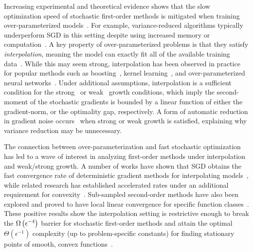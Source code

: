 Increasing experimental and theoretical evidence shows that the slow optimization speed of stochastic first-order methods is mitigated when training over-parameterized models~\citep{ma2018power, arora2018overparameterization, zhou2019analysis}.
For example, variance-reduced algorithms typically underperform \ac{SGD} in this setting despite using increased memory or computation~\citep{defazio2019effectiveness, ma2018power}. 
A key property of over-parameterized problems is that they satisfy \emph{interpolation}, meaning the model can exactly fit all of the available training data~\citep{belkin2019datainterp}.
While this may seem strong, interpolation has been observed in practice for popular methods such as boosting~\citep{schapire1997boosting}, kernel learning~\citep{belkin2019datainterp}, and over-parameterized neural networks~\citep{belkin2019reconciling, zhang2013gradient}. 
Under additional assumptions, interpolation is a sufficient condition for the strong~\citep{solodov1998incremental, tseng1998incremental, schmidt2013fast} or weak~\citep{vaswani2019fast, bassily2018exponential} growth conditions, which imply the second-moment of the stochastic gradients is bounded by a linear function of either the gradient-norm, or the optimality gap, respectively.
A form of automatic reduction in gradient noise occurs~\citep{liu2020accelerating} when strong or weak growth is satisfied, explaining why variance reduction may be unnecessary. 

The connection between over-parameterization and fast stochastic optimization has led to a wave of interest in analyzing first-order methods under interpolation and weak/strong growth.
A number of works have shown that \ac{SGD} obtains the fast convergence rate of deterministic gradient methods for interpolating models~\citep{schmidt2013fast, bassily2018exponential, vaswani2019fast, cevher2018linear, jain2018accelerating}, while related research has established accelerated rates under an additional requirement for convexity~\citep{liu2020accelerating, vaswani2019fast, jain2018accelerating}.
Sub-sampled second-order methods have also been explored and proved to have local linear convergence for specific function classes~\citep{meng2020fastandfurious}.
These positive results show the interpolation setting is restrictive enough to break the \( \Omega\left(\epsilon^{-4}\right) \) barrier for stochastic first-order methods and attain the optimal \( \Theta(\epsilon^{-1}) \) complexity (up to problem-specific constants) for finding stationary points of smooth, convex functions~\citep{nemirovsky1985optimal, arjevani2016iteration}. 


